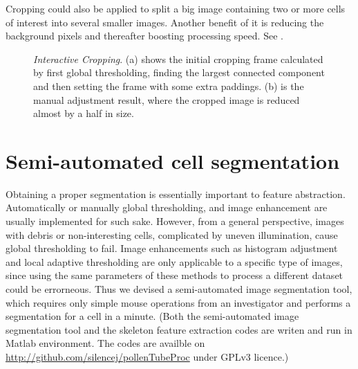 Cropping could also be applied to split a big image containing two or more cells of interest into several smaller images. Another benefit of it is reducing the background pixels and thereafter boosting processing speed. See .

\begin{figure}
\caption[Interactive Cropping]{\label{fig: cropping} \emph{Interactive Cropping}. (a) shows the initial cropping frame calculated by first global thresholding, finding the largest connected component and then setting the frame with some extra paddings. (b) is the manual adjustment result, where the cropped image is reduced almost by a half in size.}
\end{figure}





\section{Semi-automated cell segmentation}

Obtaining a proper segmentation is essentially important to feature abstraction. Automatically or manually global thresholding, and image enhancement are usually implemented for such sake. However, from a general perspective, images with debris or non-interesting cells, complicated by uneven illumination, cause global thresholding to fail. Image enhancements such as histogram adjustment and local adaptive thresholding are only applicable to a specific type of images, since using the same parameters of these methods to process a different dataset could be errorneous. Thus we devised a semi-automated image segmentation tool, which requires only simple mouse operations from an investigator and performs a segmentation for a cell in a minute. (Both the semi-automated image segmentation tool and the skeleton feature extraction codes are writen and run in Matlab environment. The codes are availble on \url{http://github.com/silencej/pollenTubeProc} under GPLv3 licence.)

